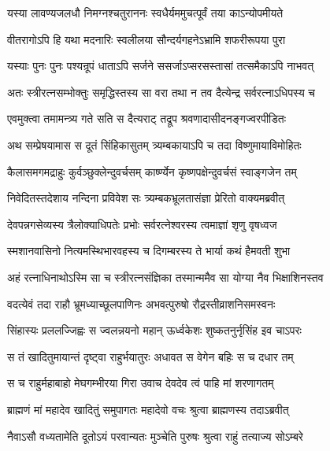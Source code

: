 \twolineshloka
{यस्या लावण्यजलधौ निमग्नश्चतुराननः}
{स्वधैर्यममुचत्पूर्वं तया काऽन्योपमीयते} %

\twolineshloka
{वीतरागोऽपि हि यथा मदनारिः स्वलीलया}
{सौन्दर्यगहनेऽभ्रामि शफरीरूपया पुरा} %

\twolineshloka
{यस्याः पुनः पुनः पश्यन्रूपं धाताऽपि सर्जने}
{ससर्जाऽप्सरसस्तासां तत्समैकाऽपि नाभवत्} %

\twolineshloka
{अतः स्त्रीरत्नसम्भोक्तुः समृद्धिस्तस्य सा वरा}
{तथा न तव दैत्येन्द्र सर्वरत्नाऽधिपस्य च} %

\twolineshloka
{एवमुक्त्वा तमामन्त्र्य गते सति स दैत्यराट्}
{तद्रूप श्रवणादासीदनङ्गज्वरपीडितः} %

\twolineshloka
{अथ सम्प्रेषयामास स दूतं सिंहिकासुतम्}
{त्र्यम्बकायाऽपि च तदा विष्णुमायाविमोहितः} %

\twolineshloka
{कैलासमगमद्राहुः कुर्वञ्छुक्लेन्दुवर्चसम्}
{कार्ष्ण्येन कृष्णपक्षेन्दुवर्चसं स्वाङ्गजेन तम्} %

\twolineshloka
{निवेदितस्तदेशाय नन्दिना प्रविवेश सः}
{त्र्यम्बकभ्रूलतासंज्ञा प्रेरितो वाक्यमब्रवीत्} %


\twolineshloka
{देवपन्नगसेव्यस्य त्रैलोक्याधिपतेः प्रभोः}
{सर्वरत्नेश्वरस्य त्वमाज्ञां शृणु वृषध्वज} %

\twolineshloka
{स्मशानवासिनो नित्यमस्थिभारवहस्य च}
{दिगम्बरस्य ते भार्या कथं हैमवती शुभा} %

\twolineshloka
{अहं रत्नाधिनाथोऽस्मि सा च स्त्रीरत्नसंज्ञिका}
{तस्मान्ममैव सा योग्या नैव भिक्षाशिनस्तव} %


\twolineshloka
{वदत्येवं तदा राहौ भ्रूमध्याच्छूलपाणिनः}
{अभवत्पुरुषो रौद्रस्तीव्राशनिसमस्वनः} %

\twolineshloka
{सिंहास्यः प्रललज्जिह्वः स ज्वलन्नयनो महान्}
{ऊर्ध्वकेशः शुष्कतनुर्नृसिंह इव चाऽपरः} %

\twolineshloka
{स तं खादितुमायान्तं दृष्ट्वा राहुर्भयातुरः}
{अधावत स वेगेन बहिः स च दधार तम्} %

\twolineshloka
{स च राहुर्महाबाहो मेघगम्भीरया गिरा}
{उवाच देवदेव त्वं पाहि मां शरणागतम्} %

\twolineshloka
{ब्राह्मणं मां महादेव खादितुं समुपागतः}
{महादेवो वचः श्रुत्वा ब्राह्मणस्य तदाऽब्रवीत्} %

\twolineshloka
{नैवाऽसौ वध्यतामेति दूतोऽयं परवान्यतः}
{मुञ्चेति पुरुषः श्रुत्वा राहुं तत्याज्य सोऽम्बरे} %




